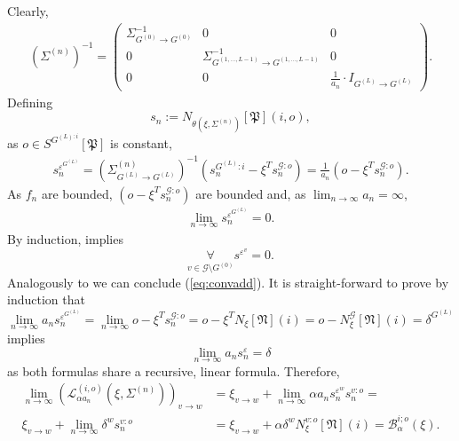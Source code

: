 \documentclass[a4paper,11pt]{report}
\begin{document}
\begin{Bew}
Clearly,
\begin{align*}
\left(\Sigma^{(n)}\right)^{-1}=
\begin{pmatrix}
\Sigma_{G^{(0)}\to G^{(0)}}^{-1} & 0 & 0 \\
0 & \Sigma_{G^{(1,\dotsc, L-1)}\to G^{(1,\dotsc, L-1)}}^{-1} & 0 \\
0 & 0 & \frac{1}{a_n}\cdot I_{G^{(L)}\to G^{(L)}}
\end{pmatrix}.
\end{align*}
Defining
\[
s_n:=N_{\theta(\xi,\Sigma^{(n)})}[\mathfrak{P}](i,o),
\]
as $o\in S^{G^{(L):i}}[\mathfrak{P}]$ is constant, 
\begin{align*}
s_n^{\varepsilon^{G^{(L)}}}=\left(\Sigma_{G^{(L)}\to G^{(L)}}^{(n)}\right)^{-1}(s_n^{G^{(L)}:i}-\xi^T s_n^{\mathcal{G}:o})=\frac{1}{a_n}(o-\xi^Ts_n^{\mathcal{G}:o}).
\end{align*}
As $f_n$ are bounded, $(o-\xi^Ts_n^{\mathcal{G}:o})$ are bounded and, as $\lim_{n\to\infty}a_n=\infty$, 
\begin{align*}
\lim_{n\to\infty}s_n^{\varepsilon^{G^{(L)}}}=0.
\end{align*}
By induction,  implies
\[
\underset{v\in\mathcal{G}\setminus G^{(0)}}{\forall}s^{\varepsilon^v}=0.
\]
Analogously to  we can conclude (\ref{eq:convadd}). It is straight-forward to prove by induction that
\[
\lim_{n\to\infty}a_ns_n^{\varepsilon^{G^{(L)}}}=\lim_{n\to\infty}o-\xi^Ts_n^{\mathcal{G}:o}=o-\xi^TN_{\xi}[\mathfrak{N}](i)=o-N_{\xi}^{\mathcal{G}}[\mathfrak{N}](i)=\delta^{G^{(L)}}
\]
implies
\[
\lim_{n\to\infty}a_ns_n^{\varepsilon}=\delta
\]
as both formulas share a recursive, linear formula. Therefore,
\begin{align*}
\lim_{n\to\infty}\left(\mathcal{L}_{\alpha a_n}^{(i,o)}(\xi,\Sigma^{(n)})\right)_{v\to w}&=\xi_{v\to w}+\lim_{n\to\infty}\alpha a_ns_n^{\varepsilon^w}s_n^{v:o}=\\
\xi_{v\to w}+\lim_{n\to\infty}\delta^ws_n^{v:o}&=\xi_{v\to w}+\alpha \delta^w N^{v:o}_{\xi}[\mathfrak{N}](i)=\mathcal{B}_{\alpha}^{i;o}(\xi).
\end{align*}
\end{Bew}
\end{document}
